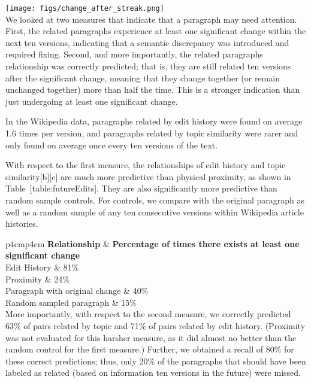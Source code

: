 \texttt{[image: figs/change\_after\_streak.png]}\\

We looked at two measures that indicate that a paragraph may need
attention. First, the related paragraphs experience at least one
significant change within the next ten versions, indicating that a
semantic discrepancy was introduced and required fixing. Second, and
more importantly, the related paragraphs relationship was correctly
predicted; that is, they are still related ten versions after the
significant change, meaning that they change together (or remain
unchanged together) more than half the time. This is a stronger
indication than just undergoing at least one significant change.

In the Wikipedia data, paragraphs related by edit history were found on
average 1.6 times per version, and paragraphs related by topic
similarity were rarer and only found on average once every ten versions
of the text.

With respect to the first measure, the relationships of edit history and
topic similarity{[}b{]}{[}c{]} are much more predictive than physical
proximity, as shown in Table~{[}table:futureEdits{]}. They are also
significantly more predictive than random sample controls. For controls,
we compare with the original paragraph as well as a random sample of any
ten consecutive versions within Wikipedia article histories.

{\textbar{}p{4cm}\textbar{}p{4cm}\textbar{}} \textbf{Relationship} \&
\textbf{Percentage of times there exists at least one significant
change}\\Edit History \& 81\%\\

Proximity \& 24\%\\

Paragraph with original change \& 40\%\\

Random sampled paragraph \& 15\%\\

More importantly, with respect to the second measure, we correctly
predicted 63\% of pairs related by topic and 71\% of pairs related by
edit history. (Proximity was not evaluated for this harsher measure, as
it did almost no better than the random control for the first measure.)
Further, we obtained a recall of 80\% for these correct predictions;
thus, only 20\% of the paragraphs that should have been labeled as
related (based on information ten versions in the future) were missed.

